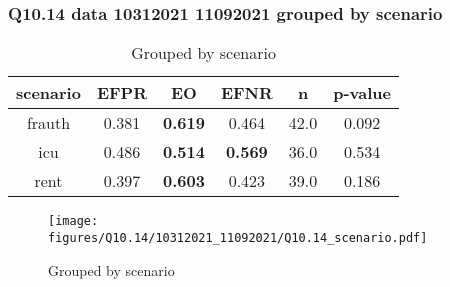 \subsubsection{Q10.14 data 10312021 11092021 grouped by scenario}

\begin{comment}
               EFPR        EO      EFNR     n    pvalue
(frauth,)  0.380952  0.619048  0.464286  42.0  0.092180
(icu,)     0.486111  0.513889  0.569444  36.0  0.533588
(rent,)    0.397436  0.602564  0.423077  39.0  0.186486
\end{comment}

\begin{table}[h]
    \centering
    \begin{tabular}{|c|c|c|c|c|c|}
        \hline
        scenario & EFPR & EO & EFNR & n & p-value\\
        \hline
        frauth & 0.381 & \textbf{0.619} & 0.464 & 42.0 & 0.092\\
		icu & 0.486 & \textbf{0.514} & \textbf{0.569} & 36.0 & 0.534\\
		rent & 0.397 & \textbf{0.603} & 0.423 & 39.0 & 0.186\\
		
        \hline
    \end{tabular}
    \caption{Grouped by scenario}
    \label{tab:my_label}
\end{table}
\begin{figure}[h]
    \centering
    \texttt{[image: figures/Q10.14/10312021\_11092021/Q10.14\_scenario.pdf]}
    \caption{Grouped by scenario}
    \label{fig:my_label}
\end{figure}
